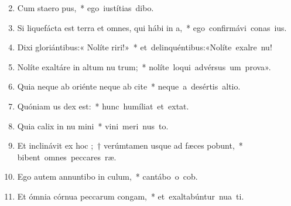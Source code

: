 \begin{flushleft}
\begin{enumerate}[leftmargin=*]
\setcounter{enumi}{1}


\item Cum staero pus,~* \mbox{ego iustítias dibo.}

\item Si liquefácta est terra et omnes, qui hábi in a,~* \mbox{ego confirmávi conas ius.}

\item Dixi gloriántibus:« Nolíte riri!»~* \mbox{et delinquéntibus:«Nolíte exalre nu!}

\item Nolíte exaltáre in altum nu trum;~* \mbox{nolíte loqui advérsus um prova».}

\item Quia neque ab oriénte neque ab cite~* \mbox{neque a desértis altio.}

\item Quóniam us dex est:~* \mbox{hunc humíliat et  extat.}

\item Quia calix in nu mini~* \mbox{vini meri nus to.}

\item Et inclinávit ex hoc ;~† verúmtamen usque ad fæces pobunt,~* \mbox{bibent omnes peccares ræ.}

\item Ego autem annuntibo in culum,~* \mbox{cantábo o cob.}

\item Et ómnia córnua peccarum congam,~* \mbox{et exaltabúntur nua ti.}


\end{enumerate}
\end{flushleft}

